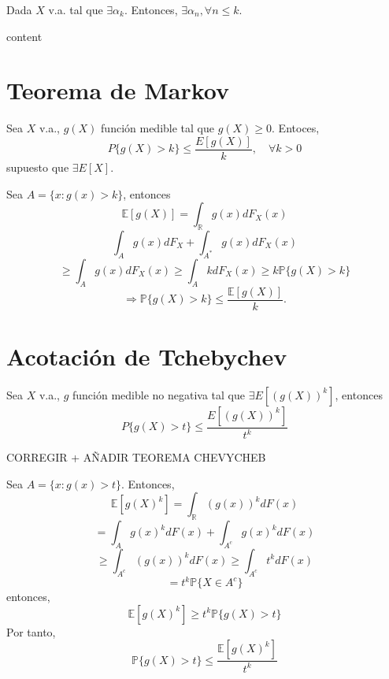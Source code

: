 \begin{prop}
  Dada $X$ v.a. tal que $\exists \alpha_{k}$. Entonces, $\exists \alpha_{n}, \forall n \leq k$.
\end{prop}

\begin{dem}
  content
\end{dem}

\section{Teorema de Markov}

\begin{theo}
  Sea $X$ v.a., $g(X)$ función medible tal que $g(X) \geq 0$. Entoces,
  \[ 
    P \{ g(X) > k \} \leq \frac{E[g(X)]}{k}, \quad \forall k > 0 
  \] 
  supuesto que $\exists E[X]$.
\end{theo}

\begin{dem}
  Sea $A = \{ x : g(x) > k \}$, entonces
  \[ 
    \mathbb{E} [ g(X) ] = \int_{\mathbb{R}}^{} g(x) dF_{X}(x)
  \] 
  \[ 
    \int_{A}^{} g(x) dF_{X} + \int_{A^{*}}^{} g(x) dF_{X}(x)
  \] 
  \[ 
    \geq \int_{A}^{} g(x) dF_{X}(x) \geq \int_{A}^{} k dF_{X}(x) \geq k \mathbb{P} \{ g(X) > k \} 
  \] 
  \[ 
    \Rightarrow \mathbb{P} \{ g(X) > k \} \leq \frac{\mathbb{E} [ g(X) ]}{k}.
  \] 
\end{dem}

\section{Acotación de Tchebychev}

\begin{prop}
  Sea $X$ v.a., $g$ función medible no negativa tal que $\exists E[(g(X))^{k}]$, entonces
  \[ 
    P \{ g(X) > t \} \leq \frac{E[(g(X))^{k}]}{t^{k}} 
  \] 
\end{prop}
CORREGIR + AÑADIR TEOREMA CHEVYCHEB

\begin{dem}
  Sea $A = \{ x : g(x) > t \}$. Entonces,
  \[ 
    \mathbb{E} [ g(X)^{k} ] = \int_{\mathbb{R}}^{} (g(x))^{k} dF(x)
  \] 
  \[ 
    = \int_{A}^{} g(x)^{k} dF(x) + \int_{A^{c}}^{} g(x)^{k} dF(x)
  \] 
  \[ 
    \geq \int_{A^{c}}^{} (g(x))^{k} dF(x) \geq \int_{A^{c}}^{} t^{k} dF(x)
  \] 
  \[ 
    = t^{k} \mathbb{P} \{ X \in A^{c} \} 
  \] 
  entonces,
  \[ 
    \mathbb{E} [ g(X)^{k} ] \geq t^{k} \mathbb{P} \{ g(X) > t \} 
  \] 
  Por tanto,
  \[ 
    \mathbb{P} \{ g(X) > t \} \leq \frac{\mathbb{E} [ g(X)^{k} ]}{t^{k}}
  \] 
\end{dem}

